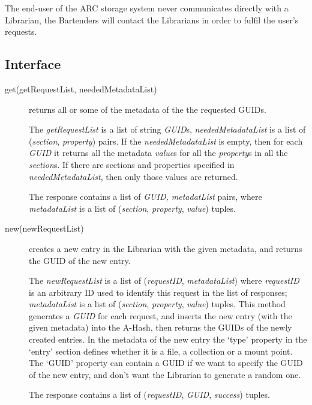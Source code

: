 \documentclass{book}
\begin{document}
The end-user of the ARC storage system never communicates directly with a Librarian, the Bartenders will contact the Librarians in order to fulfil the user's requests.


\subsection{Interface} %

\begin{description}

    \item [get(getRequestList, neededMetadataList)] returns all or some of the metadata of the the requested GUIDs.
    
    The \emph{getRequestList} is a list of string \emph{GUID}s, \emph{neededMetadataList} is a list of (\emph{section}, \emph{property}) pairs. If the \emph{neededMetadataList} is empty, then for each \emph{GUID} it returns all the metadata \emph{value}s for all the \emph{property}s in all the \emph{section}s. If there are sections and properties specified in \emph{neededMetadataList}, then only those values are returned.

    The response contains a list of \emph{GUID, metadatList} pairs, where \emph{metadataList} is a list of (\emph{section}, \emph{property}, \emph{value}) tuples.

    \item[new(newRequestList)] creates a new entry in the Librarian with the given metadata, and returns the GUID of the new entry.
    
    The \emph{newRequestList} is a list of (\emph{requestID}, \emph{metadataList}) where \emph{requestID} is an arbitrary ID used to identify this request in the list of responses; \emph{metadataList} is a list of (\emph{section}, \emph{property}, \emph{value}) tuples.
    This method generates a \emph{GUID} for each request, and inserts the new entry (with the given metadata) into the A-Hash, then returns the GUIDs of the newly created entries. In the metadata of the new entry the `type' property in the `entry' section defines whether it is a file, a collection or a mount point. The `GUID' property can contain a GUID if we want to specify the GUID of the new entry, and don't want the Librarian to generate a random one.
    
    The response contains a list of (\emph{requestID}, \emph{GUID}, \emph{success}) tuples.
    

\end{description}
\end{document}
